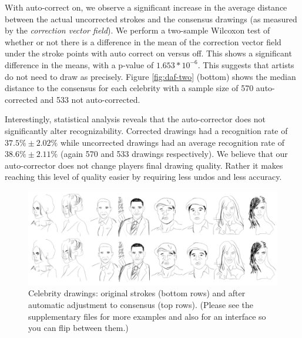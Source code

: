  
With auto-correct on,  we observe a significant increase in the average distance between the actual uncorrected strokes
and the consensus drawings (as measured by the \emph{correction vector field}). We perform a two-sample Wilcoxon test of
whether or not there is a difference in the mean of the correction vector field under the stroke points with auto correct
on versus off. This shows a significant difference in the means, with a p-value of $1.653*10^{-6}$.  This suggests that
artists do not need to draw as precisely. Figure \ref{fig:daf-two} (bottom) shows the median distance to the consensus for
each celebrity with a sample size of 570 auto-corrected and 533 not auto-corrected.
 

Interestingly, statistical analysis reveals that the auto-corrector does not significantly alter recognizability.
Corrected drawings had a recognition rate of $37.5\% \pm 2.02\%$ while uncorrected drawings had an average recognition
rate of $38.6\% \pm 2.11\%$ (again 570 and 533 drawings respectively). We believe that our auto-corrector does not change
players final drawing quality. Rather it makes reaching this level of quality easier by requiring less undos and less
accuracy.

\begin{figure}[!t]
  \centering%
\includegraphics[width=7in]{./figures/ResultsAll_16.pdf}
\vspace{-0.35in}
  \caption{Celebrity drawings: original strokes (bottom rows) and after automatic adjustment to consensus (top rows). (Please see the supplementary files for more examples and also for an interface so you can flip between them.)}
\vspace{-0.25in}
  \label{fig:results}
\end{figure}
